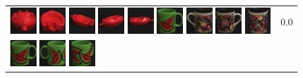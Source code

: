 {\begin{figure}[p]
\begin{tabular}{m{11cm} | m{3cm} |}
\includegraphics[width=1cm]{coil/beeld-20.eps}
\includegraphics[width=1cm]{coil/beeld-23.eps}
\includegraphics[width=1cm]{coil/beeld-22.eps}
\includegraphics[width=1cm]{coil/beeld-21.eps}
\includegraphics[width=1cm]{coil/beeld-19.eps}
\includegraphics[width=1cm]{coil/beeld-30.eps}
\includegraphics[width=1cm]{coil/beeld-61.eps}
\includegraphics[width=1cm]{coil/beeld-60.eps}
\includegraphics[width=1cm]{coil/beeld-62.eps}
& {\scriptsize 0.0}
\\
\includegraphics[width=1cm]{coil/beeld-30.eps}
\includegraphics[width=1cm]{coil/beeld-31.eps}
\includegraphics[width=1cm]{coil/beeld-33.eps}

\end{tabular}
\end{figure}}
